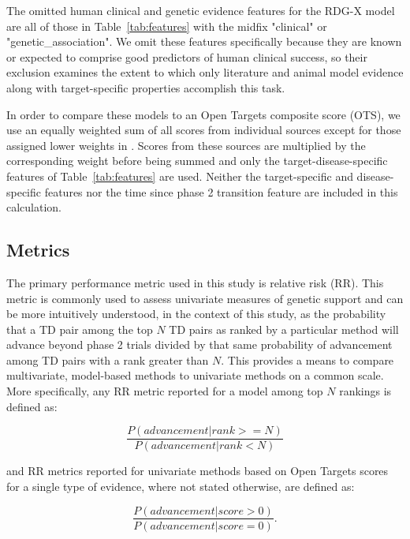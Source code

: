 \documentclass{article}
\begin{document}
The omitted human clinical and genetic evidence features for the RDG-X model are all of those in Table~\ref{tab:features} with the midfix "clinical" or "genetic\_association". We omit these features specifically because they are known or expected to comprise good predictors of human clinical success, so their exclusion examines the extent to which only literature and animal model evidence along with target-specific properties accomplish this task.

In order to compare these models to an Open Targets composite score (OTS), we use an equally weighted sum of all scores from individual sources except for those assigned lower weights in \cite{OTweights}. Scores from these sources are multiplied by the corresponding weight before being summed and only the target-disease-specific features of Table~\ref{tab:features} are used. Neither the target-specific and disease-specific features nor the time since phase 2 transition feature are included in this calculation.

\subsection{Metrics}
\label{sec:metrics}

The primary performance metric used in this study is relative risk (RR). This metric is commonly used to assess univariate measures of genetic support \cite{Nelson2015-eg,King2019-rc,Minikel2023.06.23.23291765} and can be more intuitively understood, in the context of this study, as the probability that a TD pair among the top $N$ TD pairs as ranked by a particular method will advance beyond phase 2 trials divided by that same probability of advancement among TD pairs with a rank greater than $N$. This provides a means to compare multivariate, model-based methods to univariate methods on a common scale. More specifically, any RR metric reported for a model among top $N$ rankings is defined as:

\begin{equation}
  \frac{P(advancement | rank >= N)}{P(advancement | rank < N)}
\end{equation}

and RR metrics reported for univariate methods based on Open Targets scores for a single type of evidence, where not stated otherwise, are defined as:

\begin{equation}
  \frac{P(advancement | score > 0)}{P(advancement | score = 0)}.
\end{equation}
\end{document}
